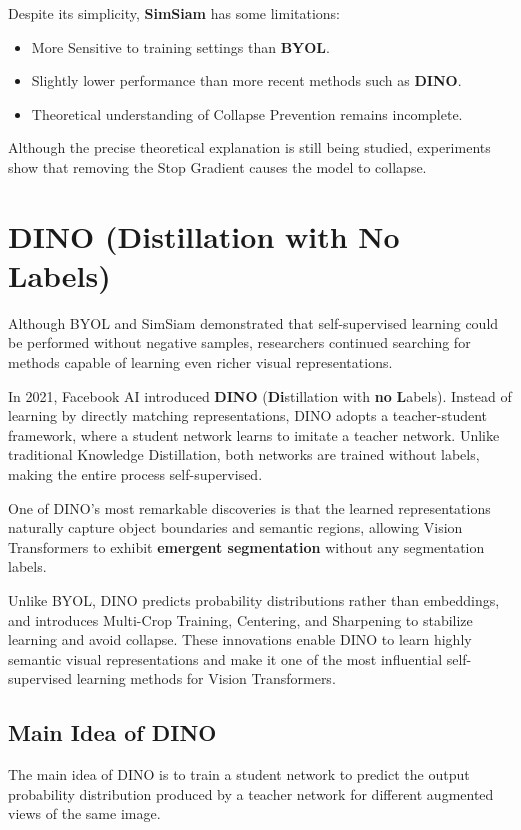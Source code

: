 Despite its simplicity, \textbf{SimSiam} has some limitations:
\begin{itemize}
    \item More Sensitive to training settings than \textbf{BYOL}.
    \item Slightly lower performance than more recent methods such as \textbf{DINO}.
    \item Theoretical understanding of Collapse Prevention remains incomplete.
\end{itemize}

Although the precise theoretical explanation is still being studied, experiments show that removing the Stop Gradient causes the model to collapse.

\section{DINO (Distillation with No Labels)}

Although BYOL and SimSiam demonstrated that self-supervised learning could be performed without negative samples, researchers continued searching for methods capable of learning even richer visual representations.

In 2021, Facebook AI introduced \textbf{DINO} (\textbf{Di}stillation with \textbf{no} \textbf{L}abels). Instead of learning by directly matching representations, DINO adopts a teacher-student framework, where a student network learns to imitate a teacher network. Unlike traditional Knowledge Distillation, both networks are trained without labels, making the entire process self-supervised.

One of DINO's most remarkable discoveries is that the learned representations naturally capture object boundaries and semantic regions, allowing Vision Transformers to exhibit \textbf{emergent segmentation} without any segmentation labels.

Unlike BYOL, DINO predicts probability distributions rather than embeddings, and introduces Multi-Crop Training, Centering, and Sharpening to stabilize learning and avoid collapse. These innovations enable DINO to learn highly semantic visual representations and make it one of the most influential self-supervised learning methods for Vision Transformers.

\subsection{Main Idea of DINO}

The main idea of DINO is to train a student network to predict the output probability distribution produced by a teacher network for different augmented views of the same image.

